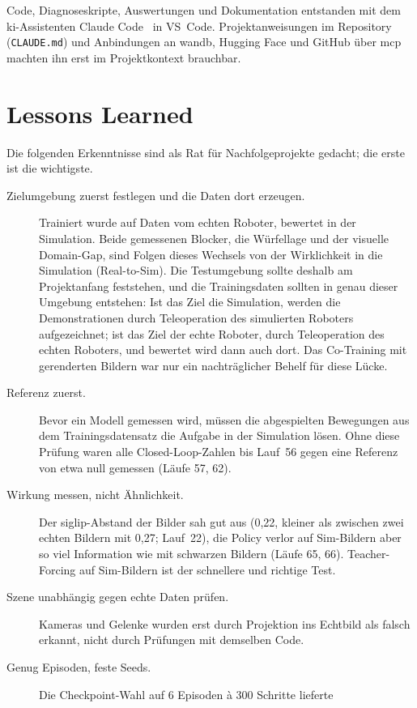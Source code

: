 Code, Diagnoseskripte, Auswertungen und Dokumentation entstanden mit dem \acs{ki}-Assistenten Claude
Code~\cite{claudecode2025} in VS~Code. Projektanweisungen im Repository (\texttt{CLAUDE.md})
und Anbindungen an \ac{wandb}, Hugging Face und GitHub über \ac{mcp}~\cite{mcp2024} machten ihn
erst im Projektkontext brauchbar.

\section{Lessons Learned}
\label{sec:lessons}
\label{sec:arbeitsmittel}

Die folgenden Erkenntnisse sind als Rat für Nachfolgeprojekte gedacht; die erste ist die
wichtigste.

\begin{description}
  \item[Zielumgebung zuerst festlegen und die Daten dort erzeugen.] Trainiert wurde auf Daten
    vom echten Roboter, bewertet in der Simulation. Beide gemessenen Blocker, die Würfellage
    und der visuelle Domain-Gap, sind Folgen dieses Wechsels von der Wirklichkeit in die
    Simulation (Real-to-Sim). Die Testumgebung sollte deshalb am Projektanfang feststehen, und
    die Trainingsdaten sollten in genau dieser Umgebung entstehen: Ist das Ziel die Simulation,
    werden die Demonstrationen durch Teleoperation des simulierten Roboters aufgezeichnet; ist
    das Ziel der echte Roboter, durch Teleoperation des echten Roboters, und bewertet wird dann
    auch dort. Das Co-Training mit gerenderten Bildern war nur ein nachträglicher Behelf für
    diese Lücke.
  \item[Referenz zuerst.] Bevor ein Modell gemessen wird, müssen die abgespielten
    Bewegungen aus dem Trainingsdatensatz die Aufgabe in der Simulation lösen. Ohne diese Prüfung waren alle
    Closed-Loop-Zahlen bis Lauf~56 gegen eine Referenz von etwa null gemessen (Läufe 57, 62).
  \item[Wirkung messen, nicht Ähnlichkeit.] Der \acs{siglip}-Abstand der Bilder sah gut aus (0,22, kleiner als
    zwischen zwei echten Bildern mit 0,27; Lauf~22),
    die Policy verlor auf Sim-Bildern aber so viel Information wie mit schwarzen Bildern
    (Läufe 65, 66). Teacher-Forcing auf Sim-Bildern ist der schnellere und richtige Test.
  \item[Szene unabhängig gegen echte Daten prüfen.] Kameras und Gelenke wurden erst durch
    Projektion ins Echtbild als falsch erkannt, nicht durch Prüfungen mit demselben Code.
  \item[Genug Episoden, feste Seeds.] Die Checkpoint-Wahl auf 6 Episoden à 300 Schritte lieferte

\end{description}
